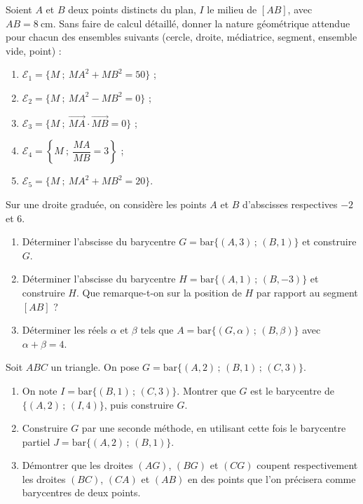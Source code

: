 \documentclass[11pt]{article}
\newcounter{popsec}
\newcounter{popsub}
\newcommand{\courssub}[1]{%
  \stepcounter{popsub}%
  \par\vspace{9pt}\noindent{\popxbold\fontsize{11.5}{13}\selectfont\color{popink}{\color{poporange}\thepopsec.\thepopsub}\hspace{6pt}#1}\par\nopagebreak\vspace{4pt}
}
\begin{document}
\begin{exercice}
Soient $A$ et $B$ deux points distincts du plan, $I$ le milieu de $[AB]$, avec $AB = 8\ \mathrm{cm}$. Sans faire de calcul détaillé, donner la nature géométrique attendue pour chacun des ensembles suivants (cercle, droite, médiatrice, segment, ensemble vide, point) :
\begin{enumerate}
\item $\mathcal{E}_1 = \{M \ ;\ MA^2 + MB^2 = 50\}$ ;
\item $\mathcal{E}_2 = \{M \ ;\ MA^2 - MB^2 = 0\}$ ;
\item $\mathcal{E}_3 = \{M \ ;\ \overrightarrow{MA} \cdot \overrightarrow{MB} = 0\}$ ;
\item $\mathcal{E}_4 = \left\{M \ ;\ \dfrac{MA}{MB} = 3\right\}$ ;
\item $\mathcal{E}_5 = \{M \ ;\ MA^2 + MB^2 = 20\}$.
\end{enumerate}
\end{exercice}

\courssub{Je m'entraîne}

\begin{exercice}
Sur une droite graduée, on considère les points $A$ et $B$ d'abscisses respectives $-2$ et $6$.
\begin{enumerate}
\item Déterminer l'abscisse du barycentre $G = \mathrm{bar}\{(A,3)\,;\,(B,1)\}$ et construire $G$.
\item Déterminer l'abscisse du barycentre $H = \mathrm{bar}\{(A,1)\,;\,(B,-3)\}$ et construire $H$. Que remarque-t-on sur la position de $H$ par rapport au segment $[AB]$ ?
\item Déterminer les réels $\alpha$ et $\beta$ tels que $A = \mathrm{bar}\{(G,\alpha)\,;\,(B,\beta)\}$ avec $\alpha + \beta = 4$.
\end{enumerate}
\end{exercice}

\begin{exercice}
Soit $ABC$ un triangle. On pose $G = \mathrm{bar}\{(A,2)\,;\,(B,1)\,;\,(C,3)\}$.
\begin{enumerate}
\item On note $I = \mathrm{bar}\{(B,1)\,;\,(C,3)\}$. Montrer que $G$ est le barycentre de $\{(A,2)\,;\,(I,4)\}$, puis construire $G$.
\item Construire $G$ par une seconde méthode, en utilisant cette fois le barycentre partiel $J = \mathrm{bar}\{(A,2)\,;\,(B,1)\}$.
\item Démontrer que les droites $(AG)$, $(BG)$ et $(CG)$ coupent respectivement les droites $(BC)$, $(CA)$ et $(AB)$ en des points que l'on précisera comme barycentres de deux points.
\end{enumerate}
\end{exercice}
\end{document}
